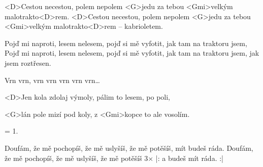 

\zs
<D>Cestou necestou, polem nepolem
<G>jedu za tebou <Gmi>velkým malotrakto<D>rem.
<D>Cestou necestou, polem nepolem
<G>jedu za tebou <Gmi>velkým malotrakto<D>rem – kabrioletem.
\ks
 
\zs
Pojď mi naproti, lesem nelesem,
pojď si mě vyfotit, jak tam na traktoru jsem, 
Pojď mi naproti, lesem nelesem,
pojď si mě vyfotit, jak tam na traktoru jsem,
jak jsem roztřesen.
\ks

\zs
Vrn vrn, vrn vrn vrn vrn vrn…
\ks
 
\hvezda
<D>Jen kola zdolaj výmoly, pálim to lesem, po poli, 

<G>lán pole mizí pod koly, z <Gmi>kopce to ale vosolím.
\ks
 
\zs
= 1.
\ks
 
\zs
Doufám, že mě pochopíš, že mě uslyšíš,
že mě potěšíš, mít budeš ráda.
Doufám, že mě pochopíš, že mě uslyšíš,
že mě potěšíš 3× |: a budeš mít ráda. :|
\ks

\kp
